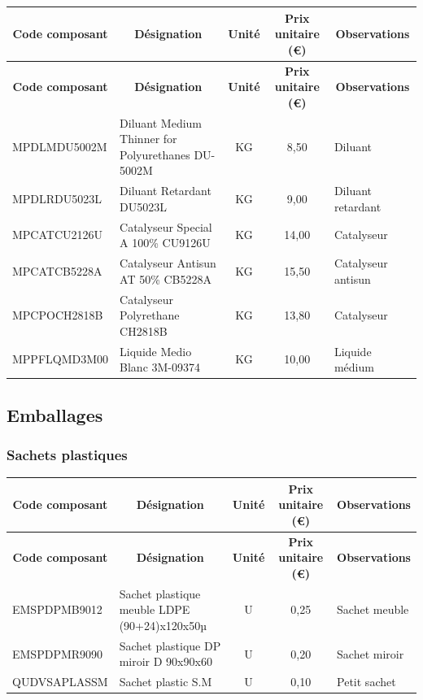 \documentclass[12pt,a4paper]{article}
\begin{document}
\begin{longtable}{|p{4cm}|p{7cm}|c|c|p{2cm}|}
\hline
\multicolumn{1}{|c|}{\textbf{Code composant}} & \multicolumn{1}{c|}{\textbf{Désignation}} & \multicolumn{1}{c|}{\textbf{Unité}} & \multicolumn{1}{c|}{\textbf{Prix unitaire (€)}} & \multicolumn{1}{c|}{\textbf{Observations}} \\
\hline
\endfirsthead
\hline
\multicolumn{1}{|c|}{\textbf{Code composant}} & \multicolumn{1}{c|}{\textbf{Désignation}} & \multicolumn{1}{c|}{\textbf{Unité}} & \multicolumn{1}{c|}{\textbf{Prix unitaire (€)}} & \multicolumn{1}{c|}{\textbf{Observations}} \\
\hline
\endhead
\hline
\endfoot
MPDLMDU5002M & Diluant Medium Thinner for Polyurethanes DU-5002M & KG & 8,50 & Diluant \\
MPDLRDU5023L & Diluant Retardant DU5023L & KG & 9,00 & Diluant retardant \\
MPCATCU2126U & Catalyseur Special A 100\% CU9126U & KG & 14,00 & Catalyseur \\
MPCATCB5228A & Catalyseur Antisun AT 50\% CB5228A & KG & 15,50 & Catalyseur antisun \\
MPCPOCH2818B & Catalyseur Polyrethane CH2818B & KG & 13,80 & Catalyseur \\
MPPFLQMD3M00 & Liquide Medio Blanc 3M-09374 & KG & 10,00 & Liquide médium \\
\hline
\end{longtable}

\subsection{Emballages}

\subsubsection{Sachets plastiques}

\begin{longtable}{|p{4cm}|p{7cm}|c|c|p{2cm}|}
\hline
\multicolumn{1}{|c|}{\textbf{Code composant}} & \multicolumn{1}{c|}{\textbf{Désignation}} & \multicolumn{1}{c|}{\textbf{Unité}} & \multicolumn{1}{c|}{\textbf{Prix unitaire (€)}} & \multicolumn{1}{c|}{\textbf{Observations}} \\
\hline
\endfirsthead
\hline
\multicolumn{1}{|c|}{\textbf{Code composant}} & \multicolumn{1}{c|}{\textbf{Désignation}} & \multicolumn{1}{c|}{\textbf{Unité}} & \multicolumn{1}{c|}{\textbf{Prix unitaire (€)}} & \multicolumn{1}{c|}{\textbf{Observations}} \\
\hline
\endhead
\hline
\endfoot
EMSPDPMB9012 & Sachet plastique meuble LDPE (90+24)x120x50µ & U & 0,25 & Sachet meuble \\
EMSPDPMR9090 & Sachet plastique DP miroir D 90x90x60 & U & 0,20 & Sachet miroir \\
QUDVSAPLASSM & Sachet plastic S.M & U & 0,10 & Petit sachet \\
\hline
\end{longtable}
\end{document}
